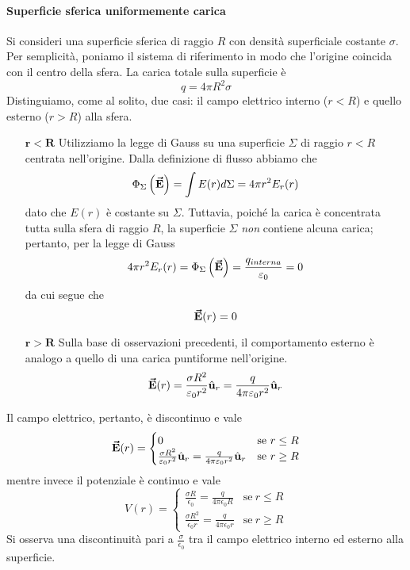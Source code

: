 \paragraph{Superficie sferica uniformemente carica}
Si consideri una superficie sferica di raggio $R$ con densità superficiale costante $\sigma$. Per semplicità, poniamo il sistema di riferimento in modo che l'origine coincida con il centro della sfera.
La carica totale sulla superficie è
\begin{equation}
	q=4\pi R^2 \sigma
\end{equation}
Distinguiamo, come al solito, due casi: il campo elettrico interno ($r<R$) e quello esterno ($r>R$) alla sfera.
\begin{itemize}
	\item[$\mathbf{r<R}$] Utilizziamo la legge di Gauss su una superficie $\Sigma$ di raggio $r<R$ centrata nell'origine. Dalla definizione di flusso abbiamo che
	\begin{equation*}
		\Phi_{\Sigma}\left(\vb*{\va{E}}\right)=\int E(r)d\Sigma=4\pi r^2 E_r(r)
	\end{equation*}
dato che $E(r)$ è costante su $\Sigma$.
Tuttavia, poiché la carica è concentrata tutta sulla sfera di raggio $R$, la superficie $\Sigma$ \textit{non} contiene alcuna carica; pertanto, per la legge di Gauss
\begin{equation*}
	4\pi r^2 E_r(r)=\Phi_{\Sigma}\left(\vb*{\va{E}}\right)=\frac{q_{interna}}{\varepsilon_0}=0
\end{equation*}
da cui segue che
\begin{equation}
	\vb*{\va{E}}(r)=0
\end{equation}
\item[$\mathbf{r>R}$] Sulla base di osservazioni precedenti, il comportamento esterno è analogo a quello di una carica puntiforme nell'origine.
\begin{equation}
	\vb*{\va{E}}(r)=\frac{\sigma R^2}{\varepsilon_0r^2}\hat{\mathbf{u}}_r=\frac{q}{4\pi\varepsilon_0r^2}\hat{\mathbf{u}}_r
\end{equation}
\end{itemize}
Il campo elettrico, pertanto, è discontinuo e vale
\begin{equation}
	\vb*{\va{E}}(r)=\begin{cases}
		0&\text{se}\ r\leq R\\
		\frac{\sigma R^2}{\varepsilon_0r^2}\hat{\mathbf{u}}_r=\frac{q}{4\pi\varepsilon_0r^2}\hat{\mathbf{u}}_r &\text{se}\ r\geq R
	\end{cases}
\end{equation}
mentre invece il potenziale è continuo e vale
\begin{equation}
	V(r)=
	\begin{cases}
	\frac{\sigma R}{\epsilon_0}=\frac{q}{4\pi\epsilon_0 R}&\text{se}\ r\leq R\\
	\frac{\sigma R^2}{\epsilon_0 r}=\frac{q}{4\pi\epsilon_0 r}&\text{se}\ r\geq R
	\end{cases}
\end{equation}
Si osserva una discontinuità pari a $\frac{\sigma}{\epsilon_0}$ tra il campo elettrico interno ed esterno alla superficie.
